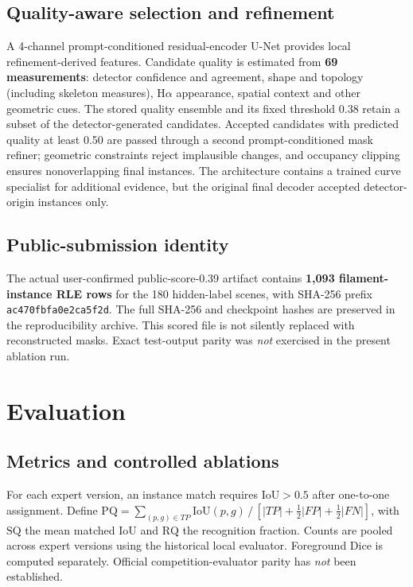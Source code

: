 \documentclass[sigconf]{acmart}
\begin{document}
\subsection{Quality-aware selection and refinement}
A 4-channel prompt-conditioned residual-encoder U-Net provides local refinement-derived features. Candidate quality is estimated from \textbf{69 measurements}: detector confidence and agreement, shape and topology (including skeleton measures), H$\alpha$ appearance, spatial context and other geometric cues. The stored quality ensemble and its fixed threshold 0.38 retain a subset of the detector-generated candidates. Accepted candidates with predicted quality at least 0.50 are passed through a second prompt-conditioned mask refiner; geometric constraints reject implausible changes, and occupancy clipping ensures nonoverlapping final instances. The architecture contains a trained curve specialist for additional evidence, but the original final decoder accepted detector-origin instances only.

\subsection{Public-submission identity}
The actual user-confirmed public-score-0.39 artifact contains \textbf{1,093 filament-instance RLE rows} for the 180 hidden-label scenes, with SHA-256 prefix \texttt{ac470fbfa0e2ca5f2d}. The full SHA-256 and checkpoint hashes are preserved in the reproducibility archive. This scored file is not silently replaced with reconstructed masks. Exact test-output parity was \emph{not} exercised in the present ablation run.

\section{Evaluation}\label{sec:evaluation}
\subsection{Metrics and controlled ablations}
For each expert version, an instance match requires IoU$>0.5$ after one-to-one assignment. Define $\mathrm{PQ}=\sum_{(p,g)\in TP}\mathrm{IoU}(p,g)\,/\,[|TP|+\tfrac12|FP|+\tfrac12|FN|]$, with $\mathrm{SQ}$ the mean matched IoU and $\mathrm{RQ}$ the recognition fraction. Counts are pooled across expert versions using the historical local evaluator. Foreground Dice is computed separately. Official competition-evaluator parity has \emph{not} been established.
\end{document}
